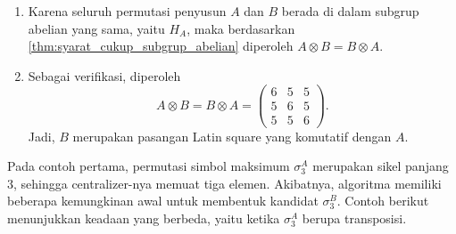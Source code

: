 \begin{contoh}
\begin{enumerate}
    \item Karena seluruh permutasi penyusun $A$ dan $B$ berada di dalam
          subgrup abelian yang sama, yaitu $H_A$, maka berdasarkan
          \autoref{thm:syarat_cukup_subgrup_abelian} diperoleh
          $A\otimes B=B\otimes A$.

    \item Sebagai verifikasi, diperoleh
          \[
            A\otimes B
            =
            B\otimes A
            =
            \begin{pmatrix}
              6 & 5 & 5 \\
              5 & 6 & 5 \\
              5 & 5 & 6
            \end{pmatrix}.
          \]
          Jadi, $B$ merupakan pasangan Latin square yang komutatif dengan $A$.
  \end{enumerate}
\end{contoh}

Pada contoh pertama, permutasi simbol maksimum $\sigma_3^A$ merupakan sikel panjang $3$, sehingga centralizer-nya memuat tiga elemen. Akibatnya, algoritma memiliki beberapa kemungkinan awal untuk membentuk kandidat $\sigma_3^B$. Contoh berikut menunjukkan keadaan yang berbeda, yaitu ketika $\sigma_3^A$ berupa transposisi.

